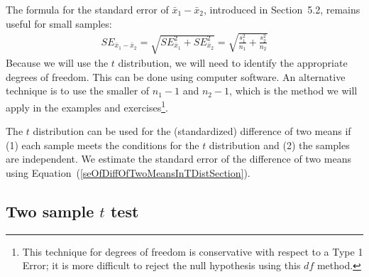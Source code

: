 The formula for the standard error of $\bar{x}_{1} - \bar{x}_{2}$, introduced in Section~5.2,  %
remains useful for small samples:
\begin{eqnarray}
SE_{\bar{x}_1 - \bar{x}_2}
	= \sqrt{SE_{\bar{x}_1}^2 + SE_{\bar{x}_2}^2}
	 = \sqrt{\frac{s_1^2}{n_1} + \frac{s_2^2}{n_2}} \label{seOfDiffOfTwoMeansInTDistSection}
\end{eqnarray}
Because we will use the $t$ distribution, we will need to identify the appropriate degrees of freedom. This can be done using computer software. An alternative technique is to use the smaller of $n_1 - 1$ and $n_2 - 1$, which is the method we will apply in the examples and exercises\footnote{This technique for degrees of freedom is conservative with respect to a Type 1 Error; it is more difficult to reject the null hypothesis using this $df$ method.}. 

\begin{termBox}{
The $t$ distribution can be used for the (standardized) difference of two means if (1) each sample meets the conditions for the $t$ distribution and (2) the samples are independent. We estimate the standard error of the difference of two means using Equation~(\ref{seOfDiffOfTwoMeansInTDistSection}).}
\end{termBox}


\subsection{Two sample $t$ test}


